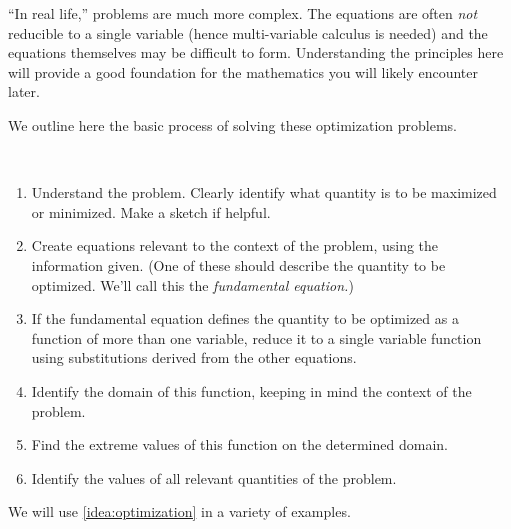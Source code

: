 ``In real life,'' problems are much more complex. The equations are often \emph{not} reducible to a single variable (hence multi-variable calculus is needed) and the equations themselves may be difficult to form. Understanding the principles here will provide a good foundation for the mathematics you will likely encounter later.

We outline here the basic process of solving these optimization problems.
\begin{keyidea}\label{idea:optimization}
~\\[-\baselineskip]
\begin{enumerate}
	\item	Understand the problem. Clearly identify what quantity is to be maximized or minimized. Make a sketch if helpful.
	\item	Create equations relevant to the context of the problem, using the information given. (One of these should describe the quantity to be optimized. We'll call this the \emph{fundamental equation.})
	\item	If the fundamental equation defines the quantity to be optimized as a function of more than one variable, reduce it to a single variable function using substitutions derived from the other equations.
%
	\item	Identify the domain of this function, keeping in mind the context of the problem.
	\item	Find the extreme values of this function on the determined domain.
	\item	Identify the values of all relevant quantities of the problem.
\end{enumerate}
\end{keyidea}

We will use \autoref{idea:optimization} in a variety of examples.

